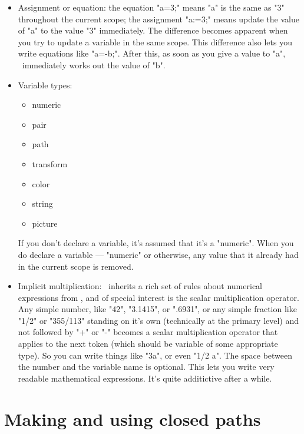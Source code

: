 \documentclass[a4paper,landscape]{article}
\begin{document}
\begin{itemize}
    \item Assignment or equation:  the equation "a=3;" means "a" is the same as "3" throughout the
        current scope; the assignment "a:=3;" means update the value of "a" to the value "3"
        immediately.  The difference becomes apparent when you try to update a
        variable in the same scope.  This difference also lets you write equations
        like "a=-b;".  After this, as soon as you give  a value to "a", \MP\ immediately works
        out the value of "b".

    \item Variable types:  
       \begin{itemize}
           \item numeric
           \item pair
           \item path
           \item transform
           \item color
           \item string
           \item picture
       \end{itemize}

       If you don’t declare a variable, it’s assumed that it’s a "numeric".
       When you do declare a variable --- "numeric" or otherwise, any value that it
       already had in the current scope is removed.
            
    \item Implicit multiplication: \MP\ inherits a rich set of rules about numerical
        expressions from \MF, and of special interest is the scalar multiplication
        operator.  Any simple number, like "42", "3.1415", or ".6931", or any simple
        fraction like "1/2" or "355/113" standing on it’s own (technically at the
        primary level) and not followed by "+" or "-" becomes a scalar
        multiplication operator that applies to the next token (which should be variable 
        of some appropriate type).
        So you can write things like "3a", or even "1/2 a".
        The space between the number and the variable name is optional. This 
        lets you write very readable mathematical expressions. It’s quite
        additictive after a while.


\end{itemize}
    
    

\newpage
\section{Making and using closed paths}
\label{plain-shapes}
\end{document}
